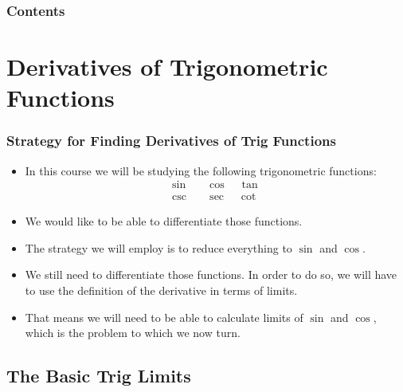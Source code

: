 \documentclass[ignorenonframetext]{beamer}
\title{\commonTitleZeroTwoFour}
\subtitle{\commonSubtitleZeroTwoFour}
\author{\commonAuthor}
\institute{\commonInstitute}
\date{\commonDateZeroTwoFour}
\begin{document}

\begin{frame}
  \titlepage
\end{frame}

\begin{frame}
  \frametitle{Contents}
  \tableofcontents
\end{frame}


\section{Derivatives of Trigonometric Functions}

\begin{frame}
  \frametitle{Strategy for Finding Derivatives of Trig Functions}
  \begin{itemize}[<+->]
  \item In this course we will be studying the following trigonometric
    functions:
    \begin{align*}
      \sin \quad &\cos \quad \tan \\
      \csc \quad &\sec \quad \cot
    \end{align*}
  \item We would like to be able to differentiate those functions.
  \item The strategy we will employ is to reduce everything to $\sin$ and
    $\cos$.
  \item We still need to differentiate those functions.  In order to do so,
    we will have to use the definition of the derivative in terms of limits.
  \item That means we will need to be able to calculate limits of $\sin$
    and $\cos$, which is the problem to which we now turn.
  \end{itemize}
\end{frame}


\subsection{The Basic Trig Limits}
\end{document}
